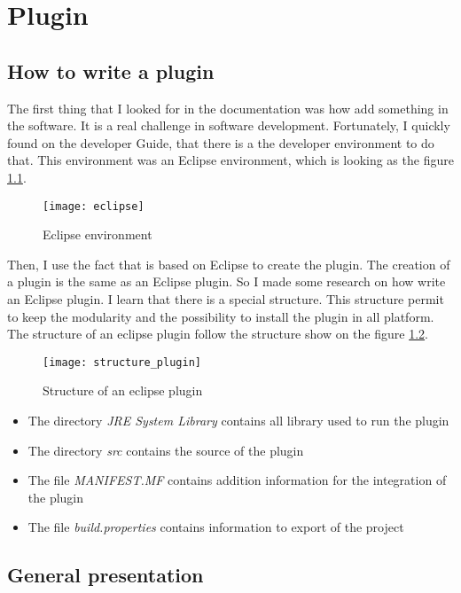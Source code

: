 
\chapter{Plugin}
\label{chap:results}


\section{How to write a plugin}


The first thing that I looked for in the \umld documentation was how add something in the software. It is a real challenge in software development. Fortunately, I quickly found on the \umld developer Guide, that there is a the developer environment to do that. This environment was an Eclipse environment, which is looking as the figure \ref{fig:eclipse}.

\begin{figure}[h]
  \centering
  \texttt{[image: eclipse]}
  \caption{Eclipse environment}
  \label{fig:eclipse}
\end{figure}

Then, I use the fact that \umld is based on Eclipse to create the plugin. The creation of a plugin is the same as an Eclipse plugin. So I made some research on how write an Eclipse plugin. I learn that there is a special structure. This structure permit to keep the modularity and the possibility to install the plugin in all platform. The structure of an eclipse plugin follow the structure show on the figure \ref{fig:plugin}.

\begin{figure}[h]
  \centering
  \texttt{[image: structure\_plugin]}
  \caption{Structure of an eclipse plugin}
  \label{fig:plugin}
\end{figure}

\noitemsep
\begin{itemize}
\item The directory \textit{JRE System Library} contains all library used to run the plugin
\item The directory \textit{src} contains the source of the plugin
\item The file \textit{MANIFEST.MF} contains addition information for the integration of the plugin
\item The file \textit{build.properties} contains information to export of the project
\end{itemize}
\doitemsep

\section{General presentation}

